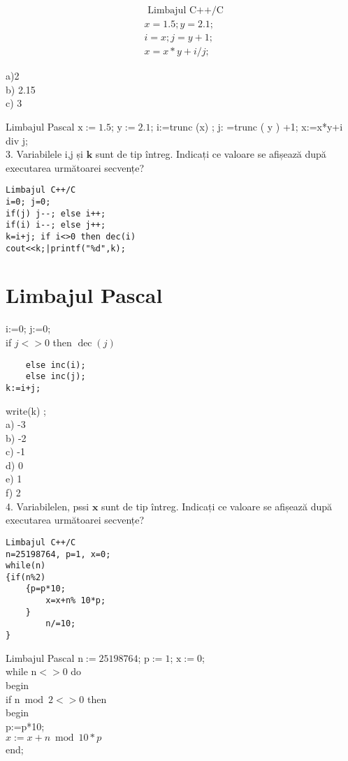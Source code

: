 $$
\begin{aligned}
& \text { Limbajul C++/C } \\
& x=1.5 ; y=2.1 ; \\
& i=x ; j=y+1 ; \\
& x=x * y+i / j ;
\end{aligned}
$$

a)2\\
b) 2.15\\
c) 3

Limbajul Pascal $\mathrm{x}:=1.5$; $\mathrm{y}:=2.1$; i:=trunc (x) ; j: =trunc ( y ) +1; x:=x*y+i div j;\\
3. Variabilele i,j și $\mathbf{k}$ sunt de tip întreg. Indicați ce valoare se afișează după executarea următoarei secvențe?

\begin{verbatim}
Limbajul C++/C
i=0; j=0;
if(j) j--; else i++;
if(i) i--; else j++;
k=i+j; if i<>0 then dec(i)
cout<<k;|printf("%d",k);
\end{verbatim}

\section*{Limbajul Pascal}
i:=0; j:=0;\\
if $j<>0$ then $\operatorname{dec}(j)$

\begin{verbatim}
    else inc(i);
    else inc(j);
k:=i+j;
\end{verbatim}

write(k) ;\\
a) -3\\
b) -2\\
c) -1\\
d) 0\\
e) 1\\
f) 2\\
4. Variabilelen, pssi $\mathbf{x}$ sunt de tip întreg. Indicați ce valoare se afișează după executarea următoarei secvențe?

\begin{verbatim}
Limbajul C++/C
n=25198764, p=1, x=0;
while(n)
{if(n%2)
    {p=p*10;
        x=x+n% 10*p;
    }
        n/=10;
}
\end{verbatim}

Limbajul Pascal $\mathrm{n}:=25198764$; $\mathrm{p}:=1$; $\mathrm{x}:=0$;\\
while $\mathrm{n}<>0$ do\\
begin\\
if $\mathrm{n} \bmod 2<>0$ then\\
begin\\
p:=p*10;\\
$x:=x+n \bmod 10 * p$\\
end;

